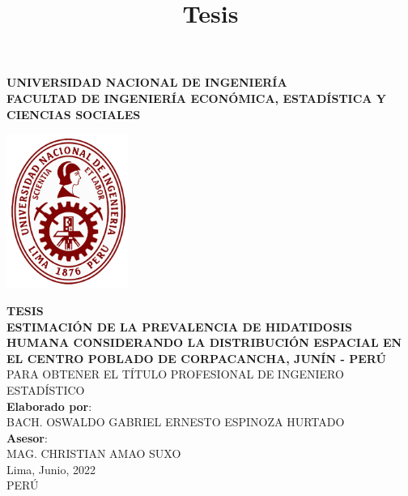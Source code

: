 \documentclass[12pt,a4paper,oneside]{report}
\begin{document}
\begin{titlepage}
 
\begin{center}
 
 {\Large \bf UNIVERSIDAD NACIONAL DE INGENIERÍA}\\[0.5cm]
 
{\bf FACULTAD DE INGENIERÍA ECONÓMICA, ESTADÍSTICA Y CIENCIAS SOCIALES}\\[1.5cm]


\begin{center}
\includegraphics[width=0.3\textwidth]{imagenes/uni_logo.png}
\end{center}

\vspace{1cm}
\title{Tesis} %

{\bf \large TESIS}\\[0.5cm]

{\bf \large ESTIMACIÓN DE LA PREVALENCIA DE HIDATIDOSIS HUMANA CONSIDERANDO LA DISTRIBUCIÓN ESPACIAL EN EL CENTRO POBLADO DE CORPACANCHA, JUNÍN - PERÚ}\\[0.5cm] %

{PARA OBTENER EL TÍTULO PROFESIONAL DE INGENIERO ESTADÍSTICO}\\[1cm]
 
{{\bf Elaborado por}:\\ BACH. OSWALDO GABRIEL ERNESTO ESPINOZA HURTADO}\\[1cm] %

{{\bf Asesor}:\\ MAG. CHRISTIAN AMAO SUXO}\\[0.5cm] %

{\large Lima, Junio, 2022}\\[0.2cm] %
{PERÚ}
\end{center}

\end{titlepage}
\end{document}
